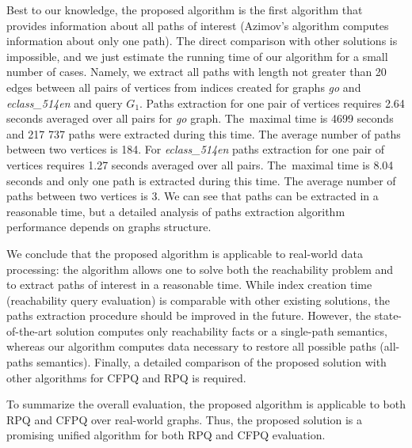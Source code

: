 Best to our knowledge, the proposed algorithm is the first algorithm that provides information about all paths of interest (Azimov's algorithm computes information about only one path).
The direct comparison with other solutions is impossible, and we just estimate the running time of our algorithm for a small number of cases.
Namely, we extract all paths with length not greater than 20 edges between all pairs of vertices from indices created for graphs \textit{go} and \textit{eclass\_514en} and query $G_1$.
Paths extraction for one pair of vertices requires 2.64 seconds averaged over all pairs for \textit{go} graph. The~maximal time is 4699 seconds and 217 737 paths were extracted during this time. The average number of paths between two vertices is 184.
For \textit{eclass\_514en} paths extraction for one pair of vertices requires 1.27 seconds averaged over all pairs. The~maximal time is 8.04 seconds and only one path is extracted during this time. The average number of paths between two vertices is 3.
We can see that paths can be extracted in a reasonable time, but a detailed analysis of paths extraction algorithm performance depends on graphs structure.



We conclude that the proposed algorithm is applicable to real-world data processing: the algorithm allows one to solve both the reachability problem and to extract paths of interest in a reasonable time.
While index creation time (reachability query evaluation) is comparable with other existing solutions, the paths extraction procedure should be improved in the future. However, the state-of-the-art solution computes only reachability facts or a single-path semantics, whereas our algorithm computes data necessary to restore all possible paths (all-paths semantics).
Finally, a detailed comparison of the proposed solution with other algorithms for CFPQ and RPQ is required.

To summarize the overall evaluation, the proposed algorithm is applicable to both RPQ and CFPQ over real-world graphs.
Thus, the proposed solution is a promising unified algorithm for both RPQ and CFPQ evaluation.
